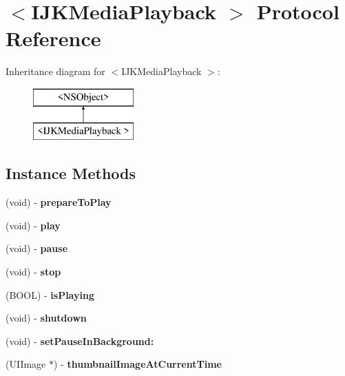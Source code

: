\hypertarget{protocol_i_j_k_media_playback_01-p}{}\section{$<$I\+J\+K\+Media\+Playback $>$ Protocol Reference}
\label{protocol_i_j_k_media_playback_01-p}
Inheritance diagram for $<$I\+J\+K\+Media\+Playback $>$\+:\begin{figure}[H]
\begin{center}
\leavevmode
\includegraphics[height=2.000000cm]{protocol_i_j_k_media_playback_01-p}
\end{center}
\end{figure}
\subsection*{Instance Methods}
\begin{DoxyCompactItemize}
\item 
\mbox{\label{protocol_i_j_k_media_playback_01-p_a5f8327e47f7be52883f1713131d43a55}} 
(void) -\/ {\bfseries prepare\+To\+Play}
\item 
\mbox{\label{protocol_i_j_k_media_playback_01-p_a1f846d175d10afed87bd9554c199c2b3}} 
(void) -\/ {\bfseries play}
\item 
\mbox{\label{protocol_i_j_k_media_playback_01-p_aa5b270d9c1eee031b0e36d42f40d7daa}} 
(void) -\/ {\bfseries pause}
\item 
\mbox{\label{protocol_i_j_k_media_playback_01-p_a6a52157b65b3882756bf2f815a2fd6c2}} 
(void) -\/ {\bfseries stop}
\item 
\mbox{\label{protocol_i_j_k_media_playback_01-p_a8a4545b217adb6c2c1600728149e6f38}} 
(B\+O\+OL) -\/ {\bfseries is\+Playing}
\item 
\mbox{\label{protocol_i_j_k_media_playback_01-p_aeddfe26e15aada7d172a3ab074960162}} 
(void) -\/ {\bfseries shutdown}
\item 
\mbox{\label{protocol_i_j_k_media_playback_01-p_aa3b178c08d4c1167363661c069a06d8d}} 
(void) -\/ {\bfseries set\+Pause\+In\+Background\+:}
\item 
\mbox{\label{protocol_i_j_k_media_playback_01-p_a15b3df4070f1b4a299473ed8d82ae8e2}} 
(U\+I\+Image $\ast$) -\/ {\bfseries thumbnail\+Image\+At\+Current\+Time}
\end{DoxyCompactItemize}
